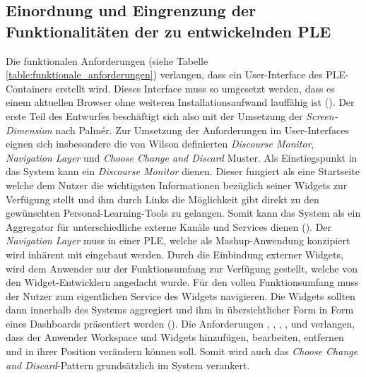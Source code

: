 \subsection{Einordnung und Eingrenzung der Funktionalitäten der zu entwickelnden PLE}
Die funktionalen Anforderungen (siehe Tabelle \ref{table:funktionale_anforderungen}) verlangen, dass ein User-Interface des PLE-Containers erstellt wird. Dieses Interface muss so umgesetzt werden, dass es einem aktuellen Browser ohne weiteren Installationsaufwand lauffähig ist (). Der erste Teil des Entwurfes beschäftigt sich also mit der Umsetzung der \emph{Screen-Dimension} nach Palmér. Zur Umsetzung der Anforderungen im User-Interfaces eignen sich insbesondere die von Wilson definierten \emph{Discourse Monitor}, \emph{Navigation Layer} und \emph{Choose Change and Discard} Muster. Als Einstiegspunkt in das System kann ein \emph{Discourse Monitor} dienen. Dieser fungiert als eine Startseite welche dem Nutzer die wichtigsten Informationen bezüglich seiner Widgets zur Verfügung stellt  und ihm durch Links die Möglichkeit gibt direkt zu den gewünschten Personal-Learning-Tools zu gelangen. Somit kann das System als ein Aggregator für unterschiedliche externe Kanäle und Services dienen (). Der \emph{Navigation Layer} muss in einer PLE, welche als Mashup-Anwendung konzipiert wird inhärent mit eingebaut werden. Durch die Einbindung externer Widgets, wird dem Anwender nur der Funktionsumfang zur Verfügung gestellt, welche von den Widget-Entwicklern angedacht wurde. Für den vollen Funktionsumfang muss der Nutzer zum eigentlichen Service des Widgets navigieren. Die Widgets sollten dann innerhalb des Systems aggregiert und ihm in übersichtlicher Form in Form eines Dashboards präsentiert werden (). Die Anforderungen , , , ,  und  verlangen, dass der Anwender Workspace und Widgets hinzufügen, bearbeiten, entfernen und in ihrer Position verändern können soll. Somit wird auch das \emph{Choose Change and Discard}-Pattern grundsätzlich im System verankert.  

